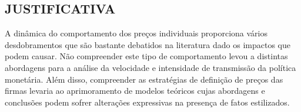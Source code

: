 \documentclass[twoside,a4paper,11pt]{report}
\begin{document}
% 


\subsection*{JUSTIFICATIVA}

A dinâmica do comportamento dos preços individuais proporciona vários desdobramentos que são bastante debatidos na literatura dado os impactos que podem causar. Não compreender este tipo de comportamento levou a distintas abordagens para a análise da velocidade e intensidade de transmissão da política monetária. Além disso, compreender as estratégias de definição de preços das firmas levaria ao aprimoramento de modelos teóricos cujas abordagens e conclusões podem sofrer alterações expressivas na presença de fatos estilizados. 
\end{document}
